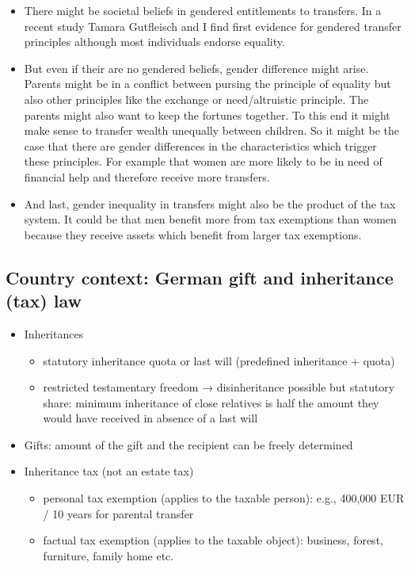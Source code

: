 \documentclass[
  letterpaper,
  DIV=11,
  numbers=noendperiod]{scrartcl}
\providecommand{\tightlist}{%
  \setlength{\itemsep}{0pt}\setlength{\parskip}{0pt}}\usepackage{longtable,booktabs,array}
\begin{document}
\begin{itemize}
\item
  There might be societal beliefs in gendered entitlements to transfers.
  In a recent study Tamara Gutfleisch and I find first evidence for
  gendered transfer principles although most individuals endorse
  equality.
\item
  But even if their are no gendered beliefs, gender difference might
  arise. Parents might be in a conflict between pursing the principle of
  equality but also other principles like the exchange or
  need/altruistic principle. The parents might also want to keep the
  fortunes together. To this end it might make sense to transfer wealth
  unequally between children. So it might be the case that there are
  gender differences in the characteristics which trigger these
  principles. For example that women are more likely to be in need of
  financial help and therefore receive more transfers.
\item
  And last, gender inequality in transfers might also be the product of
  the tax system. It could be that men benefit more from tax exemptions
  than women because they receive assets which benefit from larger tax
  exemptions.
\end{itemize}

\hypertarget{country-context-german-gift-and-inheritance-tax-law}{%
\subsection{\texorpdfstring{Country context: German gift and inheritance
(tax)
law}{Country context:   German gift and inheritance (tax) law}}\label{country-context-german-gift-and-inheritance-tax-law}}

\begin{itemize}
\tightlist
\item
  Inheritances

  \begin{itemize}
  \tightlist
  \item
    statutory inheritance quota or last will (predeﬁned inheritance +
    quota)
  \item
    restricted testamentary freedom → disinheritance possible but
    statutory share: minimum inheritance of close relatives is half the
    amount they would have received in absence of a last will
  \end{itemize}
\item
  Gifts: amount of the gift and the recipient can be freely determined
\item
  Inheritance tax (not an estate tax)

  \begin{itemize}
  \tightlist
  \item
    personal tax exemption (applies to the taxable person): e.g.,
    400,000 EUR / 10 years for parental transfer
  \item
    factual tax exemption (applies to the taxable object): business,
    forest, furniture, family home etc.
  \end{itemize}
\end{itemize}
\end{document}

